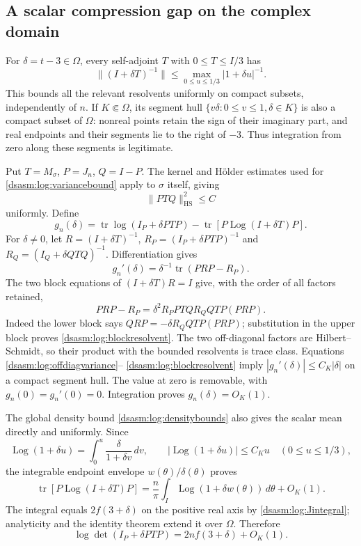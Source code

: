 \documentclass[11pt,letterpaper]{article}
\theoremstyle{remark}\newtheorem{remark}[theorem]{Remark}
\newcommand{\HS}{\mathrm{HS}}
\DeclareMathOperator{\tr}{tr}\DeclareMathOperator{\Ran}{Ran}
\begin{document}
\subsection{A scalar compression gap on the complex domain}
For $\delta=t-3\in\Omega$, every self-adjoint $T$ with
$0\le T\le I/3$ has
\[
 \|(I+\delta T)^{-1}\|
 \le\max_{0\le u\le1/3}|1+\delta u|^{-1}.
\]
This bounds all the relevant resolvents uniformly on compact subsets,
independently of $n$. If $K\Subset\Omega$, its segment hull
$\{v\delta:0\le v\le1,\delta\in K\}$ is also a compact subset of
$\Omega$: nonreal points retain the sign of their imaginary part,
and real endpoints and their segments lie to the right of $-3$.
Thus integration from zero along these segments is legitimate.

Put $T=M_\sigma$, $P=J_n$, $Q=I-P$. The kernel and H\"older estimates
used for \eqref{dsasm:log:variancebound} apply to $\sigma$ itself, giving
\begin{equation}\label{dsasm:log:offdiagvariance}
 \|PTQ\|_\HS^2\le C
\end{equation}
uniformly. Define
\[
 g_n(\delta)=\tr\log(I_P+\delta PTP)
                  -\tr[P\operatorname{Log}(I+\delta T)P].
\]
For $\delta\ne0$, let $R=(I+\delta T)^{-1}$,
$R_P=(I_P+\delta PTP)^{-1}$ and $R_Q=(I_Q+\delta QTQ)^{-1}$.
Differentiation gives
\begin{equation}\label{dsasm:log:gapderivative}
 g_n'(\delta)=\delta^{-1}\tr(PRP-R_P).
\end{equation}
The two block equations of $(I+\delta T)R=I$ give, with the order
of all factors retained,
\begin{equation}\label{dsasm:log:blockresolvent}
 PRP-R_P=\delta^2 R_PPTQ R_QQTP(PRP).
\end{equation}
Indeed the lower block says $QRP=-\delta R_QQTP(PRP)$; substitution
in the upper block proves \eqref{dsasm:log:blockresolvent}. The two off-diagonal
factors are Hilbert--Schmidt, so their product with the bounded
resolvents is trace class. Equations \eqref{dsasm:log:offdiagvariance}--
\eqref{dsasm:log:blockresolvent} imply
$|g_n'(\delta)|\le C_K|\delta|$ on a compact segment hull.
The value at zero is removable, with $g_n(0)=g_n'(0)=0$.
Integration proves $g_n(\delta)=O_K(1)$.

The global density bound \eqref{dsasm:log:densitybounds} also gives the scalar
mean directly and uniformly. Since
\[
 \operatorname{Log}(1+\delta u)=\int_0^u\frac{\delta}{1+\delta v}\,dv,
 \qquad |\operatorname{Log}(1+\delta u)|\le C_Ku
 \quad(0\le u\le1/3),
\]
the integrable endpoint envelope $w(\theta)/\delta(\theta)$ proves
\[
 \tr[P\operatorname{Log}(I+\delta T)P]
 =\frac n\pi\int_I\operatorname{Log}(1+\delta w(\theta))\,d\theta
                       +O_K(1).
\]
The integral equals $2f(3+\delta)$ on the positive real axis by
\eqref{dsasm:log:Jintegral}; analyticity and the identity theorem extend it
over $\Omega$. Therefore
\begin{equation}\label{dsasm:log:scalcomplex}
 \log\det(I_P+\delta PTP)=2nf(3+\delta)+O_K(1).
\end{equation}
\end{document}
